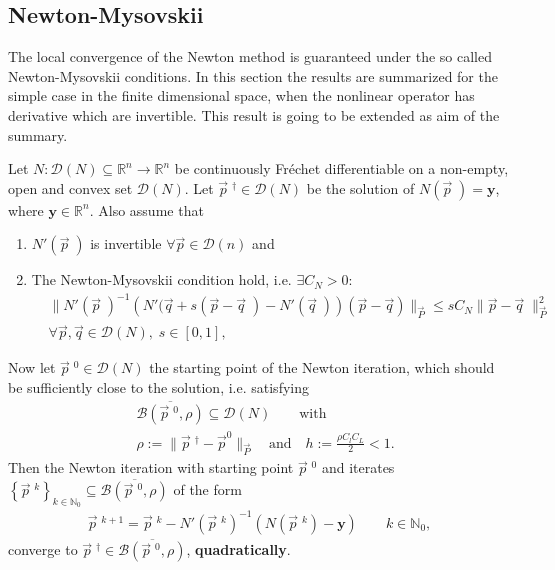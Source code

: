 \subsection{Newton-Mysovskii}
The local convergence of the Newton method is guaranteed under the so called Newton-Mysovskii
 conditions. In this section the results are summarized for the simple case in the
 finite dimensional space, when the nonlinear operator has derivative which
 are invertible. This result is going to be extended as aim of the summary.
 \begin{theorem}
     Let $N: \mathcal{D}(N) \subseteq \mathbb{R}^{n}\to \mathbb{R}^{n}$ be
     continuously Fr\'echet differentiable on a non-empty, open and convex
     set $\mathcal{D}\left( N \right) $. Let $\vec{p}\;^{\dagger} \in
     \mathcal{D}(N)$ be the solution of $N(\vec{p}\;) = \mathbf{y}$, where
     $\mathbf{y} \in \mathbb{R}^{n}$. Also assume that
     \begin{enumerate}
         \item $N'(\vec{p}\;)$ is invertible $\forall \vec{p} \in
             \mathcal{D}(n)$ and
         \item The Newton-Mysovskii condition hold, i.e. $\exists C_N > 0:$
            \begin{align}
                &\big\| N'(\vec{p}\;)^{-1}\left( N'(\vec{q} + s(\vec{p} -
                \vec{q}\;) - N'(\vec{q}\;)\right) (\vec{p} - \vec{q})
                \big\|_{\vec{P}}
                \leq s C_N \|\vec{p} - \vec{q} \;\|^{2}_{\vec{P}}\\
                & \forall \vec{p}, \vec{q} \in \mathcal{D}(N), \; s \in[0,
                1],
            \end{align}
     \end{enumerate}
     Now let $\vec{p}\;^{0} \in \mathcal{D}(N)$ the starting point of the
     Newton iteration, which should be sufficiently close to the solution,
     i.e. satisfying
     \begin{align}
         &\overline{\mathcal{B}\left(\vec{p}\;^{0}, \rho \right)}\subseteq
         \mathcal{D}(N) \qquad \text{with}\\
         &\rho := \|\vec{p}\;^{\dagger} - \vec{p}^{0}\|_{\vec{P}} \quad
         \text{and} \quad h:= \frac{\rho C_l C_L}{2} <1. \label{eq: locality}
     \end{align}
     Then the Newton iteration with starting point $\vec{p}\;^{0}$ and
     iterates $\left\{\vec{p}\;^{k}  \right\}_{k \in \mathbb{N}_0} \subseteq
     \overline{\mathcal{B}(\vec{p}\;^{0}, \rho)} $ of the
     form
     \begin{align}
         \vec{p}\;^{k+1} = \vec{p}\;^{k} - N'(\vec{p}\;^{k})^{-1}\left(
         N\left(\vec{p}\;^{k}  \right) - \mathbf{y} \right)  \qquad k \in
         \mathbb{N}_0,
     \end{align}
     converge to $\vec{p}\;^{\dagger} \in \overline{\mathcal{B}(\vec{p}\;^{0},
     \rho)}$, \textbf{quadratically}.
 \end{theorem}

